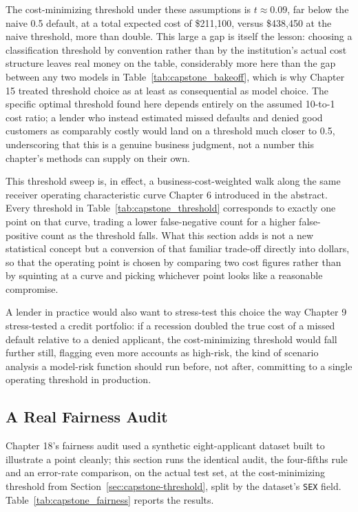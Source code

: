 \documentclass[../ai_in_finance]{subfiles}
\begin{document}
The cost-minimizing threshold under these assumptions is $t \approx 0.09$, far below the naive 0.5 default, at a total expected cost of \$211,100, versus \$438,450 at the naive threshold, more than double. This large a gap is itself the lesson: choosing a classification threshold by convention rather than by the institution's actual cost structure leaves real money on the table, considerably more here than the gap between any two models in Table~\ref{tab:capstone_bakeoff}, which is why Chapter 15 treated threshold choice as at least as consequential as model choice. The specific optimal threshold found here depends entirely on the assumed 10-to-1 cost ratio; a lender who instead estimated missed defaults and denied good customers as comparably costly would land on a threshold much closer to 0.5, underscoring that this is a genuine business judgment, not a number this chapter's methods can supply on their own.

This threshold sweep is, in effect, a business-cost-weighted walk along the same receiver operating characteristic curve Chapter 6 introduced in the abstract. Every threshold in Table~\ref{tab:capstone_threshold} corresponds to exactly one point on that curve, trading a lower false-negative count for a higher false-positive count as the threshold falls. What this section adds is not a new statistical concept but a conversion of that familiar trade-off directly into dollars, so that the operating point is chosen by comparing two cost figures rather than by squinting at a curve and picking whichever point looks like a reasonable compromise.

A lender in practice would also want to stress-test this choice the way Chapter 9 stress-tested a credit portfolio: if a recession doubled the true cost of a missed default relative to a denied applicant, the cost-minimizing threshold would fall further still, flagging even more accounts as high-risk, the kind of scenario analysis a model-risk function should run before, not after, committing to a single operating threshold in production.

\subsection{A Real Fairness Audit}
\label{sec:capstone-fairness}

Chapter 18's fairness audit used a synthetic eight-applicant dataset built to illustrate a point cleanly; this section runs the identical audit, the four-fifths rule and an error-rate comparison, on the actual test set, at the cost-minimizing threshold from Section~\ref{sec:capstone-threshold}, split by the dataset's \texttt{SEX} field. Table~\ref{tab:capstone_fairness} reports the results.
\end{document}

